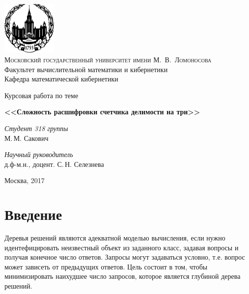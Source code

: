 \documentclass[oneside, final, 14pt]{extreport}
\begin{document}
	\renewcommand\contentsname{Содержание} %
	\thispagestyle{empty}
	
	\begin{center}
		\ \vspace{-1cm}
		
		\includegraphics[width=0.2\textwidth]{logo-mgu.png}\\
		{\scshape Московский государственный университет имени М.~В.~Ломоносова}\\
		Факультет вычислительной математики и кибернетики\\
		Кафедра математической кибернетики
		
		\vfill
		
		{\LARGE Курсовая работа по теме}
		
		\vspace{1cm}
		
		{\Huge\bfseries <<Сложность расшифровки счетчика делимости на три>>}
	\end{center}
	
	\vspace{1cm}
	
	\begin{flushright}
		\large
		\textit{Студент 318 группы}\\
		М.\,М. Сакович
		
		\vspace{5mm}
		
		\textit{Научный руководитель}\\
		д.ф-м.н., доцент. С.\,Н. Селезнева
	\end{flushright}
	
	\vfill
	
	\begin{center}
		Москва, 2017
	\end{center}

	\tableofcontents
	\chapter*{Введение}
	Деревья  решений являются адекватной моделью вычисления, если нужно идентефицировать неизвестный объект из заданного 
	класс, задавая вопросы и получая конечное число ответов. Запросы могут задаваться условно, т.е. вопрос может зависеть от предыдущих 
	ответов. Цель состоит в том, чтобы минимизировать наихудшее число запросов, которое является глубиной дерева решений.
	
\end{document}
